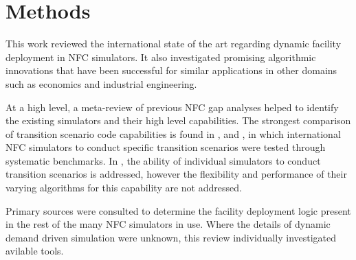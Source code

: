 \section{Methods}

This work reviewed the international state of the art regarding dynamic 
facility deployment in \gls{NFC} simulators. It also investigated promising 
algorithmic innovations that have been successful for similar applications in 
other domains such as economics and industrial engineering.

At a high level, a meta-review of previous \gls{NFC} gap analyses 
\cite{stuff,stuff} helped to identify the existing simulators and their high 
level capabilities. The strongest comparison of transition scenario code 
capabilities is found in \cite{boucher_international_2010}, 
\cite{brown_identification_2016} and \cite{mccarthy_benchmark_2012}, in which 
international \gls{NFC} simulators to conduct specific transition scenarios 
were tested through systematic benchmarks. In 
\cite{carre_overview_2016,hoffman_expanded_2016}, the ability of individual 
simulators to conduct transition scenarios is addressed, however the 
flexibility and performance of their varying algorithms for this capability are 
not addressed.

Primary sources were consulted to determine the facility deployment logic present in the 
rest of the many \gls{NFC} simulators in use. Where the details of dynamic 
demand driven simulation were unknown, this review individually investigated 
avilable tools. 
